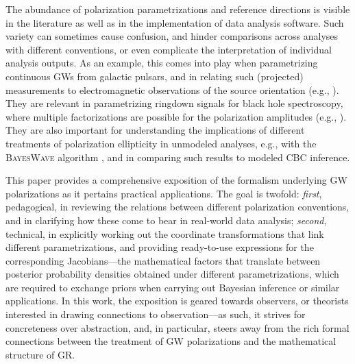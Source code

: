 \documentclass[aps,prd,twocolumn,superscriptaddress,preprintnumbers,floatfix,nofootinbib]{revtex4-2}
\begin{document}
The abundance of polarization parametrizations and reference directions is visible in the literature as well as in the implementation of data analysis software.
Such variety can sometimes cause confusion, and hinder comparisons across analyses with different conventions, or even complicate the interpretation of individual analysis outputs.
As an example, this comes into play when parametrizing continuous GWs from galactic pulsars, and in relating such (projected) measurements to electromagnetic observations of the source orientation (e.g., \cite{Ng:2007te,Dupuis:2005xv,Isi:2017equ,Pitkin:2017qfy}).
They are relevant in parametrizing ringdown signals for black hole spectroscopy, where multiple factorizations are possible for the polarization amplitudes (e.g., \cite{Isi:2021iql,Carullo:2019flw,LIGOScientific:2020tif,LIGOScientific:2021sio}).
They are also important for understanding the implications of different treatments of polarization ellipticity in unmodeled analyses, e.g., with the \textsc{BayesWave} algorithm \cite{Cornish:2014kda,Cornish:2020dwh,Chatziioannou:2021mij}, and in comparing such results to modeled \ac{CBC} inference.

This paper provides a comprehensive exposition of the formalism underlying GW polarizations as it pertains practical applications.
The goal is twofold:
\emph{first}, pedagogical, in reviewing the relations between different polarization conventions, and in clarifying how these come to bear in real-world data analysis;
\emph{second}, technical, in explicitly working out the coordinate transformations that link different parametrizations, and providing ready-to-use expressions for the corresponding Jacobians---the mathematical factors that translate between posterior probability densities obtained under different parametrizations, which are required to exchange priors when carrying out Bayesian inference or similar applications.
%
%
%
In this work, the exposition is geared towards observers, or theorists interested in drawing connections to observation---as such, it strives for concreteness over abstraction, and, in particular, steers away from the rich formal connections between the treatment of GW polarizations and the mathematical structure of GR.
\end{document}
